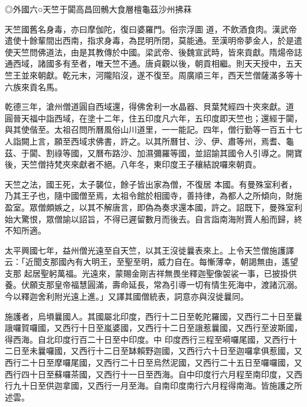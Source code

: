 
\begin{pinyinscope}

 ◎外國六○天竺于闐高昌回鶻大食層檀龜茲沙州拂菻



 天竺國舊名身毒，亦曰摩伽陀，復曰婆羅門。俗宗浮圖
 道，不飲酒食肉。漢武帝遣使十餘輩間出西南，指求身毒，為昆明所閉，莫能通。至漢明帝夢金人，於是遣使天竺問佛道法，由是其教傳於中國。梁武帝、後魏宣武時，皆來貢獻。隋煬帝誌通西域，諸國多有至者，唯天竺不通。唐貞觀以後，朝貢相繼。則天天授中，五天竺王並來朝獻。乾元末，河隴陷沒，遂不復至。周廣順三年，西天竺僧薩滿多等十六族來貢名馬。



 乾德三年，滄州僧道圓自西域還，得佛舍利一水晶器、貝葉梵經四十夾來獻。道
 圓晉天福中詣西域，在塗十二年，住五印度凡六年，五印度即天竺也；還經于闐，與其使偕至。太祖召問所曆風俗山川道里，一一能記。四年，僧行勤等一百五十七人詣闕上言，願至西域求佛書，許之。以其所曆甘、沙、伊、肅等州，焉耆、龜茲、于闐、割祿等國，又曆布路沙、加濕彌羅等國，並詔諭其國令人引導之。開寶後，天竺僧持梵夾來獻者不絕。八年冬，東印度王子穰結說囉來朝貢。



 天竺之法，國王死，太子襲位，餘子皆出家為僧，不復居
 本國。有曼殊室利者，乃其王子也，隨中國僧至焉，太祖令館於相國寺，善持律，為都人之所傾向，財施盈室。眾僧頗嫉之，以其不解唐言，即偽為奏求還本國，許之。詔既下，曼殊室利始大驚恨，眾僧諭以詔旨，不得已遲留數月而後去。自言詣南海附賈人船而歸，終不知所適。



 太平興國七年，益州僧光遠至自天竺，以其王沒徙曩表來上。上令天竺僧施護譯云：「近聞支那國內有大明王，至聖至明，威力自在。每慚薄幸，朝謁無由，遙望支那
 起居聖躬萬福。光遠來，蒙賜金剛吉祥無畏坐釋迦聖像袈裟一事，已披掛供養。伏願支那皇帝福慧圓滿，壽命延長，常為引導一切有情生死海中，渡諸沉溺。今以釋迦舍利附光遠上進。」又譯其國僧統表，詞意亦與沒徙曩同。



 施護者，烏塤曩國人。其國屬北印度，西行十二日至乾陀羅國，又西行二十日至曩誐囉賀囉國，又西行十日至嵐婆國，又西行十二日至誐惹曩國，又西行至波斯國，得西海。自北印度行百二十日至中印度。中
 印度西行三程至嗬囉尾國，又西行十二日至未曩囉國，又西行十二日至缽賴野迦國，又西行六十日至迦囉拿俱惹國，又西行二十日至摩囉尾國，又西行二十日至烏然泥國，又西行二十五日至囉囉國，又西行四十日至蘇囉茶國，又西行十一日至西海。自中印度行六月程至南印度，又西行九十日至供迦拿國，又西行一月至海。自南印度南行六月程得南海。皆施護之所述雲。




\end{pinyinscope}
